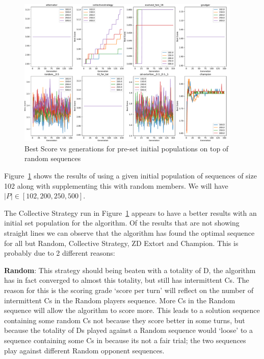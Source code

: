\begin{figure}[ht]
    \includegraphics[width=0.95\textwidth, keepaspectratio, center]{./img/plots/NEW_INIT_POP_bs_v_gen_all_old.pdf}
    \caption{Best Score vs generations for pre-set initial populations on top of random sequences}\label{fig:NEW-INIT-POP-bs-v-gen-all}
\end{figure}

Figure~\ref{fig:NEW-INIT-POP-bs-v-gen-all} shows the results of using a given initial population of sequences of size 102 along with supplementing this with random members.
We will have \(|P| \in [102,200,250,500]\).

The Collective Strategy run in Figure~\ref{fig:NEW-INIT-POP-bs-v-gen-all} appears to have a better results with an initial set population for the algorithm.
Of the results that are not showing straight lines we can observe that the algorithm has found the optimal sequence for all but Random, Collective Strategy, ZD Extort and Champion.
This is probably due to 2 different reasons:

\textbf{Random}: This strategy should being beaten with a totality of D, the algorithm has in fact converged to almost this totality, but still has intermittent Cs.
The reason for this is the scoring grade `score per turn' will reflect on the number of intermittent Cs in the Random players sequence.
More Cs in the Random sequence will allow the algorithm to score more.
This leads to a solution sequence containing some random Cs not because they score better in some turns, but because the totality of Ds played against
a Random sequence would `loose' to a sequence containing some Cs in because its not a fair trial;
the two sequences play against different Random opponent sequences.

